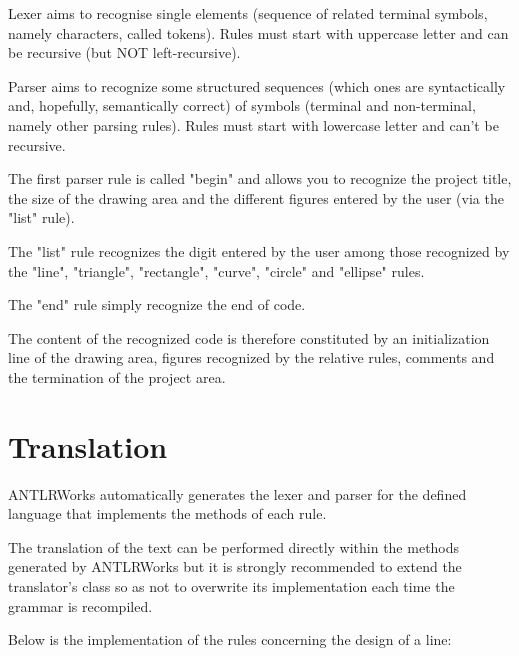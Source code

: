 \documentclass[a4paper]{article}
\begin{document}
Lexer aims to recognise single elements (sequence of related terminal symbols, namely characters, called tokens).
Rules must start with uppercase  letter and can be recursive (but NOT left-recursive).
 
Parser aims to  recognize  some  structured sequences (which ones are syntactically and, hopefully, semantically correct)
of symbols (terminal and  non-terminal, namely other parsing
rules).
Rules must start with lowercase letter and can't be recursive.

The first parser rule is called "begin" and allows you to recognize the project title, the size of the drawing area and the different figures entered by the user (via the "list" rule).

The "list" rule recognizes the digit entered by the user among those recognized by the "line", "triangle", "rectangle", "curve", "circle" and "ellipse" rules.

The "end" rule simply recognize the end of code.

The content of the recognized code is therefore constituted by an initialization line of the drawing area, figures recognized by the relative rules, comments and the termination of the project area.

\newpage

\section{Translation}

ANTLRWorks automatically generates the lexer and parser for the defined language that implements the methods of each rule.

The translation of the text can be performed directly within the methods generated by ANTLRWorks but it is strongly recommended to extend the translator's class so as not to overwrite its implementation each time the grammar is recompiled.

\vspace{1\baselineskip}

Below is the implementation of the rules concerning the design of a line:
\end{document}
